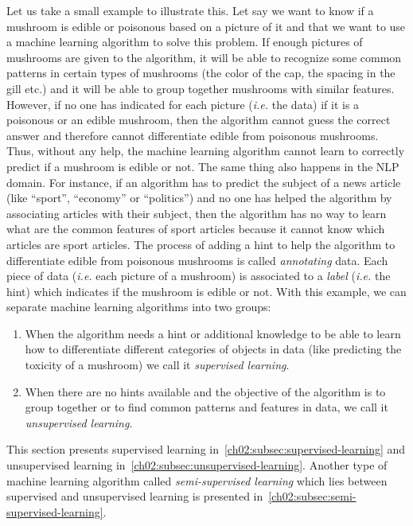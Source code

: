   Let us take a small example to illustrate this. Let say we want to know if a
  mushroom is edible or poisonous based on a picture of it and that we want to
  use a machine learning algorithm to solve this problem. If enough pictures of
  mushrooms are given to the algorithm, it will be able to recognize some common
  patterns in certain types of mushrooms (the color of the cap, the spacing in
  the gill etc.) and it will be able to group together mushrooms with similar
  features. However, if no one has indicated for each picture (\textit{i.e.} the
  data) if it is a poisonous or an edible mushroom, then the algorithm cannot
  guess the correct answer and therefore cannot differentiate edible from
  poisonous mushrooms. Thus, without any help, the machine learning algorithm
  cannot learn to correctly predict if a mushroom is edible or not. The same
  thing also happens in the NLP domain. For instance, if an algorithm has to
  predict the subject of a news article (like ``sport'', ``economy'' or
  ``politics'') and no one has helped the algorithm by associating articles with
  their subject, then the algorithm has no way to learn what are the common
  features of sport articles because it cannot know which articles are sport
  articles. The process of adding a hint to help the algorithm to differentiate
  edible from poisonous mushrooms is called \textit{annotating} data. Each piece
  of data (\textit{i.e.} each picture of a mushroom) is associated to a
  \textit{label} (\textit{i.e.} the hint) which indicates if the mushroom is
  edible or not. With this example, we can separate machine learning algorithms
  into two groups:

  \begin{enumerate}
    \item When the algorithm needs a hint or additional knowledge to be able to
      learn how to differentiate different categories of objects in data (like
      predicting the toxicity of a mushroom) we call it \textit{supervised
      learning}.
    \item When there are no hints available and the objective of the algorithm is
      to group together or to find common patterns and features in data, we call
      it \textit{unsupervised learning}.
  \end{enumerate}

  \noindent This section presents supervised learning
  in~\autoref{ch02:subsec:supervised-learning} and unsupervised learning
  in~\autoref{ch02:subsec:unsupervised-learning}. Another type of machine
  learning algorithm called \textit{semi-supervised learning} which lies between
  supervised and unsupervised learning is presented
  in~\autoref{ch02:subsec:semi-supervised-learning}.

